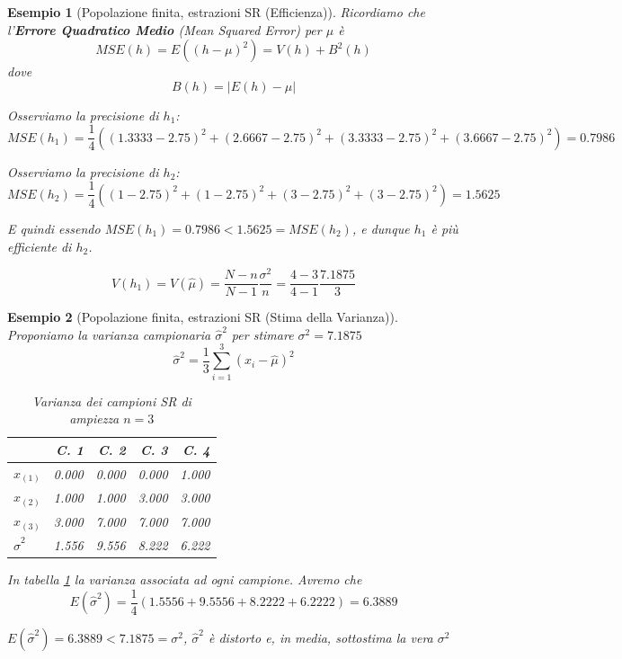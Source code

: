 \documentclass[
  11pt,
]{book}
\theoremstyle{mytheoremstyle}
\theoremstyle{mydefstyle}
\newtheorem{example}{{Esempio}}[section]
\newenvironment{nota}
  {
\begin{tcolorbox}[enhanced,breakable,arc=0.1mm,boxrule=1pt,colback=white,colframe=iblue,title=\bf \fontfamily{lmss}\selectfont \faInfoCircle \hspace{.5 cm} Nota,drop fuzzy shadow]
}{
\end{tcolorbox}
  }
\begin{document}
\begin{example}[Popolazione finita, estrazioni SR (Efficienza)]

Ricordiamo che l'\textbf{Errore Quadratico Medio} (\emph{Mean Squared Error}) per \(\mu\) è
\[MSE(h)=E((h-\mu)^2)=V(h)+B^2(h)\]
dove
\[B(h)=|E(h)-\mu|\]

Osserviamo la precisione di \(h_1\):
\[MSE(h_1)=\frac 1{4}\left((1.3333-2.75)^2+(2.6667-2.75)^2+(3.3333-2.75)^2+(3.6667-2.75)^2\right)=0.7986\]

Osserviamo la precisione di \(h_2\):
\[MSE(h_2)=\frac 1{4}((1-2.75)^2+(1-2.75)^2+(3-2.75)^2+(3-2.75)^2)=1.5625\]

E quindi essendo \(MSE(h_1)=0.7986<1.5625=MSE(h_2)\), e dunque \(h_1\) è \emph{più efficiente} di \(h_2\).

\begin{nota}
\[V(h_1)=V(\hat \mu)=\frac{N-n}{N-1}\frac{\sigma^2}{n}=\frac{4-3}{4-1}\frac{7.1875}{3}\]

\end{nota}

\end{example}

\begin{example}[Popolazione finita, estrazioni SR (Stima della Varianza)]

Proponiamo la varianza campionaria \(\hat\sigma^2\) per stimare \(\sigma^2=7.1875\)
\[\hat\sigma^2=\frac 1 3\sum_{i=1}^3(x_i-\hat \mu)^2\]

\begin{table}[!h]
\centering
\caption{\label{tab:var-sr}Varianza dei campioni SR di ampiezza $n=3$}
\centering
\fontsize{8}{10}\selectfont
\begin{tabular}[t]{>{}l|>{}r|>{}r|>{}r|r}
\toprule
  & C. 1 & C. 2 & C. 3 & C. 4\\
\midrule
$x_{(1)}$ & 0.000 & 0.000 & 0.000 & 1.000\\
$x_{(2)}$ & 1.000 & 1.000 & 3.000 & 3.000\\
$x_{(3)}$ & 3.000 & 7.000 & 7.000 & 7.000\\
\textcolor[HTML]{012D50}{$\hat\sigma^2$} & \textcolor[HTML]{012D50}{1.556} & \textcolor[HTML]{012D50}{9.556} & \textcolor[HTML]{012D50}{8.222} & \textcolor[HTML]{012D50}{6.222}\\
\midrule
\bottomrule
\end{tabular}
\end{table}

In tabella \ref{tab:var-sr} la varianza associata ad ogni campione. Avremo che
\[E(\hat\sigma^2)=\frac 1 4 (1.5556+9.5556+8.2222+6.2222)=6.3889\]

\begin{nota}
\(E(\hat\sigma^2)=6.3889<7.1875=\sigma^2\), \(\hat\sigma^2\) è distorto e, in media, sottostima la vera \(\sigma^2\)

\end{nota}

\end{example}
\end{document}
